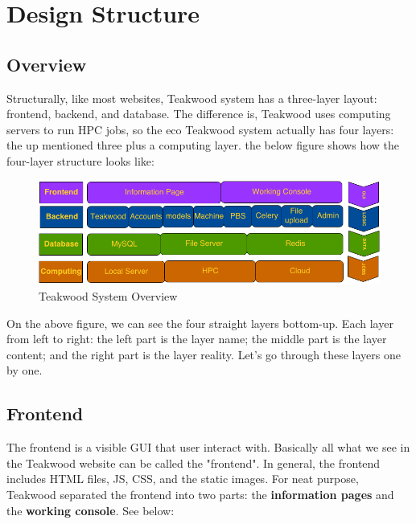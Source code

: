 \chapter{Design Structure}

\section{Overview}
Structurally, like most websites, Teakwood system has a three-layer layout: frontend, backend, and database. The difference is, Teakwood uses computing servers to run HPC jobs, so the eco Teakwood system actually has four layers: the up mentioned three plus a computing layer. the below figure shows how the four-layer structure looks like:\\

\begin{figure}[htb]
\centering
\includegraphics[scale=0.5]{./system_structure} 
\caption{Teakwood System Overview}
\label{fig:label} %
\end{figure}

On the above figure, we can see the four straight layers bottom-up. Each layer from left to right: the left part is the layer name; the middle part is the layer content; and the right part is the layer reality. Let's go through these layers one by one.

\section{Frontend}
The frontend is a visible GUI that user interact with. Basically all what we see in the Teakwood website can be called the "frontend". In general, the frontend includes HTML files, JS, CSS, and the static images. For neat purpose, Teakwood separated the frontend into two parts: the \textbf{information pages} and the \textbf{working console}. See below:

